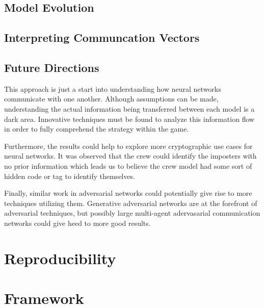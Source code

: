 \documentclass[10pt,twocolumn,letterpaper]{article}
\begin{document}
\subsection{Model Evolution}
\subsection{Interpreting Communcation Vectors}
\subsection{Future Directions}
This approach is just a start into understanding how neural networks
communicate with one another. Although assumptions can be made,
understanding the actual information being transferred between each model is
a dark area. Innovative techniques must be found to analyze this information flow 
in order to fully comprehend the strategy within the game.

Furthermore, the results could help to explore more cryptographic use cases for neural networks.
It was observed that the crew could identify the imposters with no prior information which leads us to
believe the crew model had some sort of hidden code or tag to identify themselves.

Finally, similar work in adversarial networks could potentially give rise to
more techniques utilizing them. Generative adversarial networks are at the forefront of adversarial techniques, but possibly
large multi-agent adervasarial communication networks could give heed to more good results.
{\small


}
\appendix
\section{Reproducibility}
\section{Framework}
\end{document}
